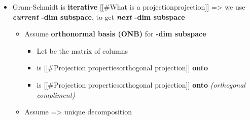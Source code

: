 \begin{itemize}

  \item
        Gram-Schmidt is \textbf{iterative} {[}{[}\#What is a
        projection\textbar projection{]}{]} =\textgreater{} we use
        \textbf{\emph{current} -dim subspace}, to get
        \textbf{\emph{next} -dim subspace}

        \begin{itemize}

          \item
                Assume \textbf{orthonormal basis (ONB)}
                for \textbf{-dim subspace
                  }

                \begin{itemize}

                  \item
                        Let
                        be the matrix of columns
                  \item
                         is {[}{[}\#Projection
                        properties\textbar orthogonal projection{]}{]} \textbf{onto
                          }
                  \item
                        is {[}{[}\#Projection properties\textbar orthogonal
                        projection{]}{]} \textbf{onto
                          } \emph{(orthogonal
                          compliment)}
                \end{itemize}
          \item
                Assume  =\textgreater{} unique
                decomposition

                \begin{itemize}


\end{itemize}
\end{itemize}
\end{itemize}
